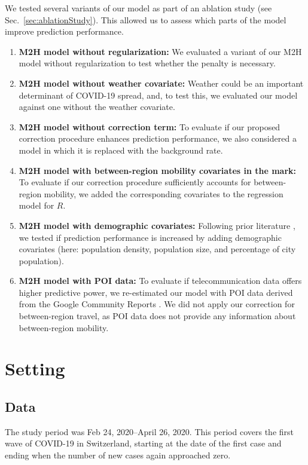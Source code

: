 \documentclass[sigconf, review = false, nonacm = true]{acmart}
\newcommand\model{M2H model\xspace}
\begin{document}
We tested several variants of our model as part of an ablation study (see Sec.~\ref{sec:ablationStudy}). This allowed us to assess which parts of the model improve prediction performance.
\begin{enumerate}
    \item \textbf{\model without regularization:} We evaluated a variant of our \model without regularization to test whether the penalty is necessary.
    \item \textbf{\model without weather covariate:} Weather could be an important determinant of COVID-19 spread, and, to test this, we evaluated our model against one without the weather covariate.
    \item \textbf{\model without correction term:} To evaluate if our proposed correction procedure enhances prediction performance, we also considered a model in which it is replaced with the background rate. 
    \item \textbf{\model with between-region mobility covariates in the mark:} To evaluate if our correction procedure sufficiently accounts for between-region mobility, we added the corresponding covariates to the regression model for $R$.
    \item \textbf{\model with demographic covariates:} Following prior literature \cite{chiang_hawkes_2020}, we tested if prediction performance is increased by adding demographic covariates (here: population density, population size, and percentage of city population).
    \item \textbf{\model with POI data:} To evaluate if telecommunication data offers higher predictive power, we re-estimated our model with POI data derived from the Google Community Reports \cite{google_llc_google_2020}. We did not apply our correction for between-region travel, as POI data does not provide any information about between-region mobility.
\end{enumerate}


\section{Setting}

\subsection{Data}
\label{sec:data}

The study period was Feb 24, 2020--April 26, 2020. This period covers the first wave of COVID-19 in Switzerland, starting at the date of the first case and ending when the number of new cases again approached zero.
\end{document}

